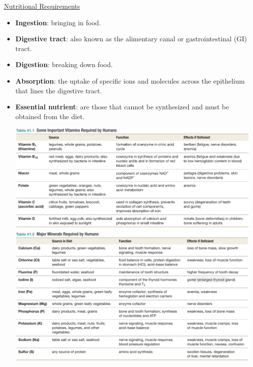 \documentclass[12pt,letterpaper]{article}
\begin{document}
\hypertarget{41.1}{}
\begin{secbox}{\hyperlink{41}{Nutritional Requirements}}{
    \begin{itemize}
        \item \textbf{Ingestion}: bringing in food.
        \item \textbf{Digestive tract}: also known as the alimentary canal or gastrointestinal (GI) tract.
        \item \textbf{Digestion}: breaking down food.
        \item \textbf{Absorption}: the uptake of specific ions and molecules across the epithelium that lines the digestive tract.
        \item \textbf{Essential nutrient}: are those that cannot be synthesized and must be obtained from the diet.\par 
        \includegraphics[width=\linewidth]{images/tbl41-1.png}\\
        \includegraphics[width=\linewidth]{images/tbl41-2.png}
    \end{itemize}
}\end{secbox}
\end{document}
